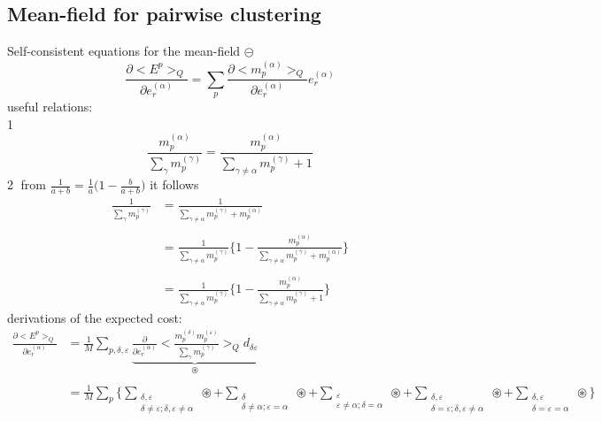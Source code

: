 \subsection{Mean-field for pairwise clustering}
Self-consistent equations for the mean-field $\circleddash$
\begin{equation}
	\frac{\partial \big<E^p\big>_Q}{\partial e_r^{(\alpha)}}
	=\sum\limits_p \frac{\partial \Big<m_p^{(\alpha)}\Big>_Q}{
		\partial e_r^{(\alpha)}} e_r^{(\alpha)}
\end{equation}
useful relations:\\
\textcircled{1}
\begin{equation}
	\frac{m_p^{(\alpha)}}{\sum\limits_\gamma m_p^{(\gamma)}} 
	= \frac{m_p^{(\alpha)}}{\sum\limits_{\gamma \neq \alpha} m_p^{(\gamma)}
		+ 1}
\end{equation}
\textcircled{2} from $\frac{1}{a+b} = \frac{1}{a} \Big(1 - \frac{b}{a+b} \Big)$ it follows
\begin{equation}
	\begin{array}{ll}
	\frac{1}{\sum\limits_\gamma m_p^{(\gamma)}} 
	& = \frac{1}{\sum\limits_{\gamma \neq \alpha} m_p^{(\gamma)} 
		+ m_p^{(\alpha)}} \\\\
	& = \frac{1}{\sum\limits_{\gamma \neq \alpha} m_p^{(\gamma)}}
		\Bigg\{ 1 - \frac{m_p^{(\alpha)}}{\sum\limits_{\gamma
			\neq \alpha} m_p^{(\gamma)} + m_p^{(\alpha)}}
		\Bigg\} \\\\
	& = \frac{1}{\sum\limits_{\gamma \neq \alpha} m_p^{(\gamma)}}
		\Bigg\{	1 - \frac{m_p^{(\alpha)}}{\sum\limits_{\gamma \neq
			\alpha} m_p^{(\gamma)} + 1}
		\Bigg\}
	\end{array}
\end{equation}
derivations of the expected cost:
\begin{equation}
	\begin{array}{ll}
	\frac{\partial \big< E^p \big>_Q}{\partial e_r^{(\alpha)}}
	& = \frac{1}{M} \sum\limits_{p,\delta,\varepsilon} 
		\underbrace{\frac{\partial}{
		\partial e_r^{(\alpha)}} \Bigg< \frac{m_p^{(\delta)} 
			m_p^{(\varepsilon)}}{\sum\limits_\gamma
				m_p^{(\gamma)}}
		\Bigg>_Q d_{\delta \varepsilon}}_{\circledast} \\\\
	& = \frac{1}{M} \sum_p \Bigg\{ 
		\sum\limits_{\substack{\delta, \varepsilon \\ \delta \neq 
			\varepsilon; \delta, \varepsilon \neq \alpha}} 
			\circledast
			+ \sum\limits_{\substack{\delta \\ \delta \neq \alpha;
				\varepsilon = \alpha}} \circledast
			+ \sum\limits_{\substack{\varepsilon \\ \varepsilon
				\neq \alpha; \delta = \alpha}} \circledast
			+ \sum\limits_{\substack{\delta, \varepsilon \\
				\delta = \varepsilon; \delta, \varepsilon
				\neq \alpha}} \circledast
			+ \sum\limits_{\substack{\delta, \varepsilon \\
				\delta = \varepsilon = \alpha}} \circledast
		\Bigg\}
	\end{array}
\end{equation}
